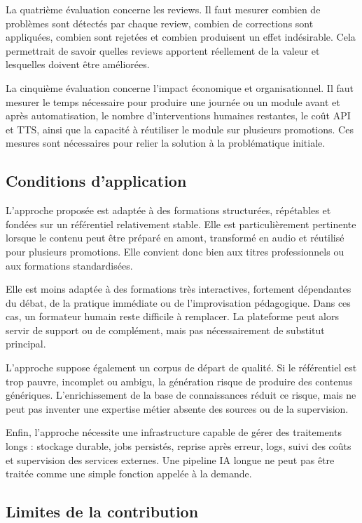 La quatrième évaluation concerne les reviews. Il faut mesurer combien de problèmes sont
détectés par chaque review, combien de corrections sont appliquées, combien sont
rejetées et combien produisent un effet indésirable. Cela permettrait de savoir quelles
reviews apportent réellement de la valeur et lesquelles doivent être améliorées.

La cinquième évaluation concerne l'impact économique et organisationnel. Il faut mesurer
le temps nécessaire pour produire une journée ou un module avant et après automatisation,
le nombre d'interventions humaines restantes, le coût API et TTS, ainsi que la capacité à
réutiliser le module sur plusieurs promotions. Ces mesures sont nécessaires pour relier la
solution à la problématique initiale.

\subsection{Conditions d'application}

L'approche proposée est adaptée à des formations structurées, répétables et fondées sur
un référentiel relativement stable. Elle est particulièrement pertinente lorsque le contenu
peut être préparé en amont, transformé en audio et réutilisé pour plusieurs promotions.
Elle convient donc bien aux titres professionnels ou aux formations standardisées.

Elle est moins adaptée à des formations très interactives, fortement dépendantes du débat,
de la pratique immédiate ou de l'improvisation pédagogique. Dans ces cas, un formateur
humain reste difficile à remplacer. La plateforme peut alors servir de support ou de
complément, mais pas nécessairement de substitut principal.

L'approche suppose également un corpus de départ de qualité. Si le référentiel est trop
pauvre, incomplet ou ambigu, la génération risque de produire des contenus génériques.
L'enrichissement de la base de connaissances réduit ce risque, mais ne peut pas inventer
une expertise métier absente des sources ou de la supervision.

Enfin, l'approche nécessite une infrastructure capable de gérer des traitements longs :
stockage durable, jobs persistés, reprise après erreur, logs, suivi des coûts et supervision
des services externes. Une pipeline IA longue ne peut pas être traitée comme une simple
fonction appelée à la demande.

\subsection{Limites de la contribution}

